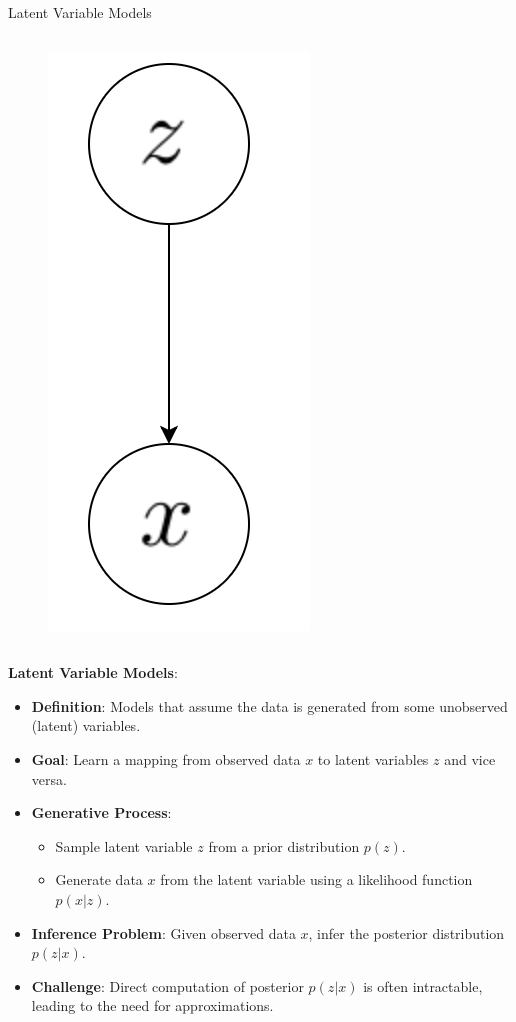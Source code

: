 \begin{frame}[allowframebreaks]{Latent Variable Models}
\begin{columns}
\begin{column}{0.4\linewidth}
            \begin{figure}
                \centering
                \includegraphics[height=0.6\textheight]{images/vae/latent-graph-2.png}
            \end{figure}
        \end{column}
    \end{columns}

\framebreak

\textbf{Latent Variable Models}:
\begin{itemize}
    \item \textbf{Definition}: Models that assume the data is generated from some unobserved (latent) variables.
    \item \textbf{Goal}: Learn a mapping from observed data \( x \) to latent variables \( z \) and vice versa.
    \item \textbf{Generative Process}:
        \begin{itemize}
            \item Sample latent variable \( z \) from a prior distribution \( p(z) \).
            \item Generate data \( x \) from the latent variable using a likelihood function \( p(x|z) \).
        \end{itemize}
    \item \textbf{Inference Problem}: Given observed data \( x \), infer the posterior distribution \( p(z|x) \).
    \item \textbf{Challenge}: Direct computation of posterior \( p(z|x) \) is often intractable, leading to the need for approximations.
\end{itemize}
\end{frame}

